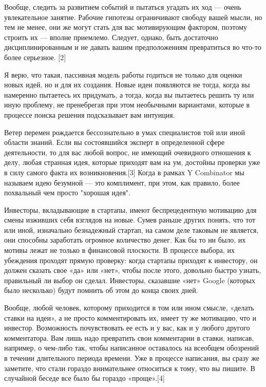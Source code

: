 \documentclass[ebook,12pt,oneside,openany]{memoir}
\begin{document}
Вообще, следить за развитием событий и пытаться угадать их ход — очень
увлекательное занятие. Рабочие гипотезы ограничивают свободу вашей
мысли, но тем не менее, они же могут стать для вас мотивирующим
фактором, поэтому строить их — вполне приемлемо. Следует, однако, быть
достаточно дисциплинированным и не давать вашим предположениям
превратиться во что-то более серьезное. [2]

Я верю, что такая, пассивная модель работы годиться не только для
оценки новых идей, но и для их создания. Новые идеи появляются не
тогда, когда вы намеренно пытаетесь их придумать, а тогда, когда вы
пытаетесь решить ту или иную проблему, не пренебрегая при этом
необычными вариантами, которые в процессе поиска решения подсказывает
вам интуиция.

Ветер перемен рождается бессознательно в умах специалистов той или
иной области знаний. Если вы состоявшийся эксперт в определенной сфере
деятельности, то для вас любой вопрос, не имеющий очевидного отношения
к делу, любая странная идея, которые приходят вам на ум, достойны
проверки уже в силу самого факта их возникновения.[3] Когда в рамках Y
Combinator мы называем идею безумной — это комплимент, при этом, как
правило, более похвальный чем просто "хорошая идея".

Инвесторы, вкладывающие в стартапы, имеют беспрецедентную мотивацию
для смены изживших себя взглядов на новые. Сумев раньше других понять,
что тот или иной, изначально безнадежный стартап, на самом деле
таковым не является, они способны заработать огромное количество
денег. Как бы то ни было, их мотивы лежат не только в финансовой
плоскости. В процессе выбора, их убеждения проходят прямую проверку:
когда стартапы приходят к инвестору, он должен сказать свое «да» или
«нет», чтобы после этого, довольно быстро узнать, правильный ли выбор
он сделал. Инвесторы, сказавшие «нет» Google (которых было несколько)
будут помнить об этом до конца своих дней.

Вообще, любой человек, которому приходится в том или ином смысле,
«делать ставки на идеи», а не просто комментировать их, имеет ту же
мотивацию, что и инвестор. Возможность почувствовать ее есть и у вас,
как и у любого другого комментатора. Вам лишь надо превратить свои
комментарии в ставки, написав, например, о чем-либо так, чтобы
написанное оставалось на всеобщем обозрений в течении длительного
периода времени. Уже в процессе написания, вы сразу же заметите, что
стали гораздо внимательнее относиться к тому, что вы пишите. В
случайной беседе все было бы гораздо «проще».[4]
\end{document}
